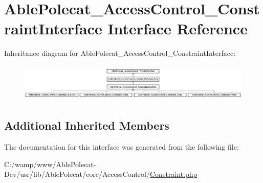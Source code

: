 \hypertarget{interface_able_polecat___access_control___constraint_interface}{}\section{Able\+Polecat\+\_\+\+Access\+Control\+\_\+\+Constraint\+Interface Interface Reference}
\label{interface_able_polecat___access_control___constraint_interface}
Inheritance diagram for Able\+Polecat\+\_\+\+Access\+Control\+\_\+\+Constraint\+Interface\+:\begin{figure}[H]
\begin{center}
\leavevmode
\includegraphics[height=1.806452cm]{interface_able_polecat___access_control___constraint_interface}
\end{center}
\end{figure}
\subsection*{Additional Inherited Members}


The documentation for this interface was generated from the following file\+:\begin{DoxyCompactItemize}
\item 
C\+:/wamp/www/\+Able\+Polecat-\/\+Dev/usr/lib/\+Able\+Polecat/core/\+Access\+Control/\hyperlink{_constraint_8php}{Constraint.\+php}\end{DoxyCompactItemize}
